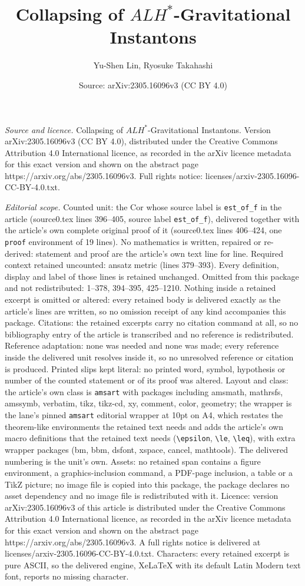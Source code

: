 \documentclass[10pt,a4paper]{amsart}
\title[Collapsing of $ALH^*$-Gravitational Instantons]{Collapsing of $ALH^*$-Gravitational Instantons}
\author{Yu-Shen Lin, Ryosuke Takahashi}
\date{Source: arXiv:2305.16096v3 (CC BY 4.0)}
\begin{document}
\maketitle

\noindent\emph{Source and licence.} Collapsing of $ALH^*$-Gravitational Instantons. Version arXiv:2305.16096v3 (CC BY 4.0), distributed under the Creative Commons Attribution 4.0 International licence, as recorded in the arXiv licence metadata for this exact version and shown on the abstract page https://arxiv.org/abs/2305.16096v3. Full rights notice: licenses/arxiv-2305.16096-CC-BY-4.0.txt.\par\smallskip

\noindent\textit{Editorial scope.} Counted unit: the Cor whose source label is \texttt{est\_of\_f} in the article (source0.tex lines 396--405, source label \texttt{est\_of\_f}), delivered together with the article's own complete original proof of it (source0.tex lines 406--424, one \texttt{proof} environment of 19 lines). No mathematics is written, repaired or re-derived: statement and proof are the article's own text line for line. Required context retained uncounted: ansatz metric (lines 379--393). Every definition, display and label of those lines is retained unchanged. Omitted from this package and not redistributed: 1--378, 394--395, 425--1210. Nothing inside a retained excerpt is omitted or altered: every retained body is delivered exactly as the article's lines are written, so no omission receipt of any kind accompanies this package. Citations: the retained excerpts carry no citation command at all, so no bibliography entry of the article is transcribed and no reference is redistributed. Reference adaptation: none was needed and none was made; every reference inside the delivered unit resolves inside it, so no unresolved reference or citation is produced. Printed slips kept literal: no printed word, symbol, hypothesis or number of the counted statement or of its proof was altered. Layout and class: the article's own class is \texttt{amsart} with packages including amsmath, mathrsfs, amssymb, verbatim, tikz, tikz-cd, xy, comment, color, geometry; the wrapper is the lane's pinned \texttt{amsart} editorial wrapper at 10pt on A4, which restates the theorem-like environments the retained text needs and adds the article's own macro definitions that the retained text needs (\texttt{\textbackslash epsilon}, \texttt{\textbackslash le}, \texttt{\textbackslash leq}), with extra wrapper packages (bm, bbm, dsfont, xspace, cancel, mathtools). The delivered numbering is the unit's own. Assets: no retained span contains a figure environment, a graphics-inclusion command, a PDF-page inclusion, a table or a TikZ picture; no image file is copied into this package, the package declares no asset dependency and no image file is redistributed with it. Licence: version arXiv:2305.16096v3 of this article is distributed under the Creative Commons Attribution 4.0 International licence, as recorded in the arXiv licence metadata for this exact version and shown on the abstract page https://arxiv.org/abs/2305.16096v3. A full rights notice is delivered at licenses/arxiv-2305.16096-CC-BY-4.0.txt. Characters: every retained excerpt is pure ASCII, so the delivered engine, XeLaTeX with its default Latin Modern text font, reports no missing character.
\end{document}
